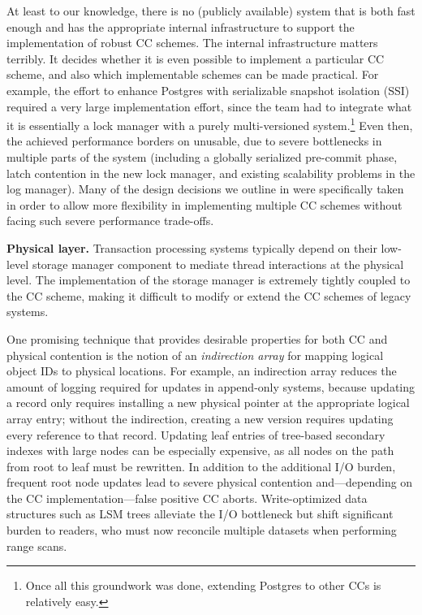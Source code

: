 At least to our knowledge, there is no (publicly available) system that is both fast enough and has the appropriate internal infrastructure to support the implementation of robust CC schemes. The internal infrastructure matters terribly. It decides whether it is even possible to implement a particular CC scheme, and also which implementable schemes can be made practical. For example, the effort to enhance Postgres with serializable snapshot isolation (SSI) required a very large implementation effort, since the team had to integrate what it is essentially a lock manager with a purely multi-versioned system.\footnote{Once all this groundwork was done, extending Postgres to other CCs is relatively easy.} Even then, the achieved performance borders on unusable, due to severe bottlenecks in multiple parts of the system (including a globally serialized pre-commit phase, latch contention in the new lock manager, and existing scalability problems in the log manager).  Many of the design decisions we outline in  were specifically taken in order to allow more flexibility in implementing multiple CC schemes without facing such severe performance trade-offs.

\vspace{2mm}
{\bf Physical layer.} 
Transaction processing systems typically depend on their low-level storage manager component to mediate thread interactions at the physical level.
The implementation of the storage manager is extremely tightly coupled to the CC scheme, making it difficult to modify or extend the CC schemes of legacy systems.  

One promising technique that provides desirable properties for both CC and physical contention is the notion of an {\em indirection array} \cite{SadoghiRCB13,Diaconu+13} for mapping logical object IDs to physical locations.
For example, an indirection array reduces the amount of logging required for updates in append-only systems, because updating a record only requires installing a new physical pointer at the appropriate logical array entry; without the indirection, creating a new version requires updating every reference to that record. Updating leaf entries of tree-based secondary indexes with large nodes can be especially expensive, as all nodes on the path from root to leaf must be rewritten. In addition to the additional I/O burden, frequent root node updates lead to severe physical contention and---depending on the CC implementation---false positive CC aborts. Write-optimized data structures such as LSM trees \cite{NeilCGO96,SearsR12} alleviate the I/O bottleneck but shift significant burden to readers, who must now reconcile multiple datasets when performing range scans. 

